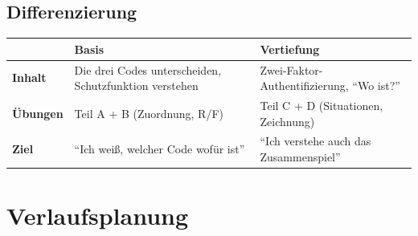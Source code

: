 \documentclass[11pt,a4paper]{article}
\begin{document}
\subsection{Differenzierung}

\begin{tabular}{|l|p{5cm}|p{5cm}|}
\hline
& \textbf{Basis} & \textbf{Vertiefung} \\
\hline
\textbf{Inhalt} & Die drei Codes unterscheiden, Schutzfunktion verstehen & Zwei-Faktor-Authentifizierung, ``Wo ist?'' \\
\hline
\textbf{Übungen} & Teil A + B (Zuordnung, R/F) & Teil C + D (Situationen, Zeichnung) \\
\hline
\textbf{Ziel} & ``Ich weiß, welcher Code wofür ist'' & ``Ich verstehe auch das Zusammenspiel'' \\
\hline
\end{tabular}

\section{Verlaufsplanung}
\end{document}
